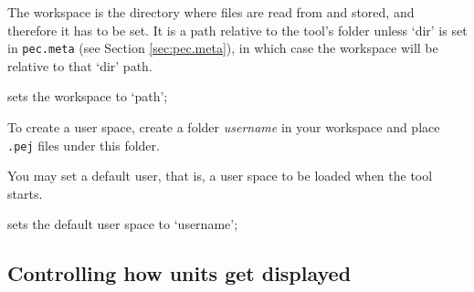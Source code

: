 The workspace is the directory where files are read from and stored, and therefore it has to be set.
It is a path relative to the tool's folder unless `dir' is set in {\tt pec.meta} (see Section \ref{sec:pec.meta}), in which case the workspace will be relative to that `dir' path.

\begin{description}
	\setlength\itemindent{0.5cm}  
	\item[\tt \param{workspace}{path}] sets the workspace to `path';
\end{description}

To create a user space, create a folder \textit{username} in your workspace and place {\tt .pej} files under this folder.

You may set a default user, that is, a user space to be loaded when the tool starts.

\begin{description}
	\setlength\itemindent{0.5cm}  
	\item[\tt \param{user}{username}] sets the default user space to `username';
\end{description}

\subsection{Controlling how units get displayed}

